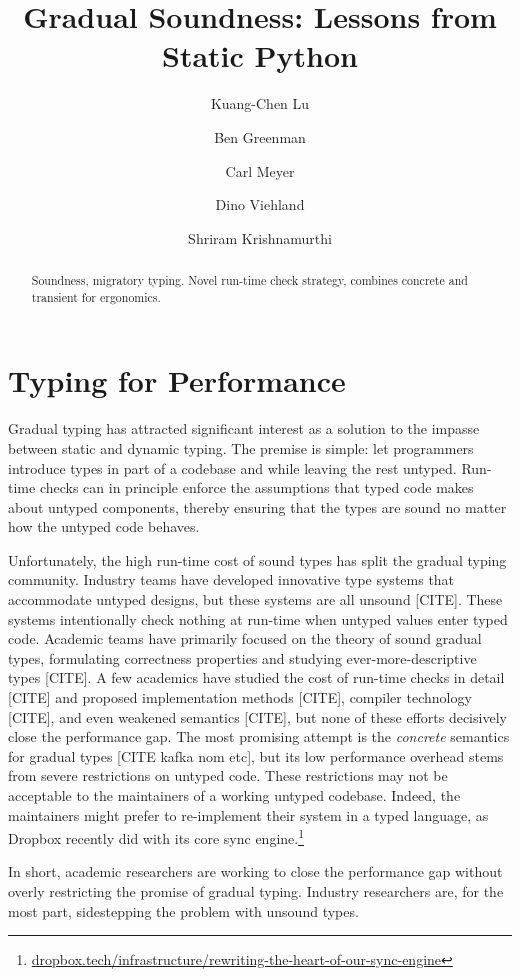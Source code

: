 \documentclass[a4paper,english,cleveref,autoref,thm-restate,anonymous,]{lipics-v2021}
\title{Gradual Soundness: Lessons from Static Python}
\author{Kuang-Chen Lu}{Department of Computer Science, Brown University, USA}{LuKuangchen1024@gmail.com}{}{}
\author{Ben Greenman}{Department of Computer Science, Brown University, USA}{benjamin.l.greenman@gmail.com}{0000-0001-7078-9287}{}
\author{Carl Meyer}{Facebook, Inc.}{carljm@fb.com}{}{}
\author{Dino Viehland}{Facebook, Inc.}{dinoviehland@fb.com}{}{}
\author{Shriram Krishnamurthi}{Department of Computer Science, Brown University, USA}{shriram@brown.edu}{0000-0001-5184-1975}{}
\begin{document}
\maketitle

\newcommand{\shorturl}[2]{\href{#1#2}{#2}}
\newcommand{\SP}{Static Python}


\begin{abstract}
  Soundness, migratory typing.
  Novel run-time check strategy, combines concrete and transient for ergonomics.
\end{abstract}


\section{Typing for Performance}
\label{s:intro}

Gradual typing has attracted significant interest as a solution to
the impasse between static and dynamic typing.
The premise is simple: let programmers introduce types in part of a
codebase and while leaving the rest untyped.
Run-time checks can in principle enforce the assumptions that
typed code makes about untyped components, thereby ensuring that
the types are sound no matter how the untyped code behaves.

Unfortunately, the high run-time cost of sound types has split
the gradual typing community.
Industry teams have developed innovative type systems that accommodate
untyped designs, but these systems are all unsound [CITE].
These systems intentionally check nothing at run-time when untyped values enter
typed code.
Academic teams have primarily focused on the theory of sound
gradual types, formulating correctness properties and studying ever-more-descriptive types [CITE].
A few academics have studied the cost of run-time checks
in detail [CITE] and proposed implementation methods [CITE],
compiler technology [CITE],
and even weakened semantics [CITE], but none of these efforts
decisively close the performance gap.
The most promising attempt is the \emph{concrete} semantics
for gradual types [CITE kafka nom etc], but its low performance
overhead stems from severe restrictions on untyped code.
These restrictions may not be acceptable to the maintainers of a
working untyped codebase.
Indeed, the maintainers might prefer to re-implement their system
in a typed language, as Dropbox recently did with its core sync
engine.\footnote{\shorturl{https://}{dropbox.tech/infrastructure/rewriting-the-heart-of-our-sync-engine}}

In short, academic researchers are working to close the performance gap
without overly restricting the promise of gradual typing.
Industry researchers are, for the most part, sidestepping the problem with unsound types.
\end{document}
